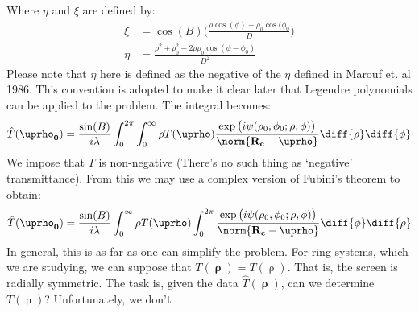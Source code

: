             Where $\eta$ and $\xi$ are defined by:
            \begin{subequations}
                \begin{align}
                    \xi&=\cos(B)\Big(
                    \frac{\rho\cos(\phi)-\rho_{0}\cos(\phi_{0}}{D}
                    \Big)\\
                    \eta&=\frac{\rho^{2}+\rho_{0}^{2}-2\rho\rho_{0}
                               \cos(\phi-\phi_{0})}{D^{2}}
                \end{align}
            \end{subequations}
            Please note that $\eta$ here is defined as the negative
            of the $\eta$ defined in Marouf et. al 1986. This
            convention is adopted to make it clear later that
            Legendre polynomials can be applied to the problem.
            The integral becomes:
            \begin{equation}
                \hat{T}(\boldsymbol{\uprho_{0}})
                =\frac{\sin(B)}{i\lambda}
                    \int_{0}^{2\pi}\int_{0}^{\infty}\rho
                    T(\boldsymbol{\uprho})
                    \frac{\exp\big(i\psi(\rho_{0},\phi_{0};
                          \rho,\phi)\big)}
                         {\norm{\mathbf{R_{c}}-\boldsymbol{\uprho}}}
                    \diff{\rho}\diff{\phi}
            \end{equation}
            We impose that $T$ is non-negative
            (There's no such thing as `negative' transmittance).
            From this we may use a complex version of Fubini's
            theorem to obtain:
            \begin{equation}
                \hat{T}(\boldsymbol{\uprho_{0}})
                =\frac{\sin(B)}{i\lambda}
                    \int_{0}^{\infty}\rho{T}(\boldsymbol{\uprho})
                    \int_{0}^{2\pi}
                    \frac{\exp\big(i\psi(\rho_{0},\phi_{0};
                          \rho,\phi)\big)}
                         {\norm{\mathbf{R_{c}}-\boldsymbol{\uprho}}}
                    \diff{\phi}\diff{\rho}
            \end{equation}
                In general, this is as far as one can simplify the
                problem. For ring systems, which we are studying, we
                can suppose that $T(\boldsymbol{\uprho})=T(\uprho)$.
                That is, the screen is radially symmetric. The task
                is, given the data $\hat{T}(\boldsymbol{\uprho})$,
                can we determine $T(\uprho)$? Unfortunately, we don't
